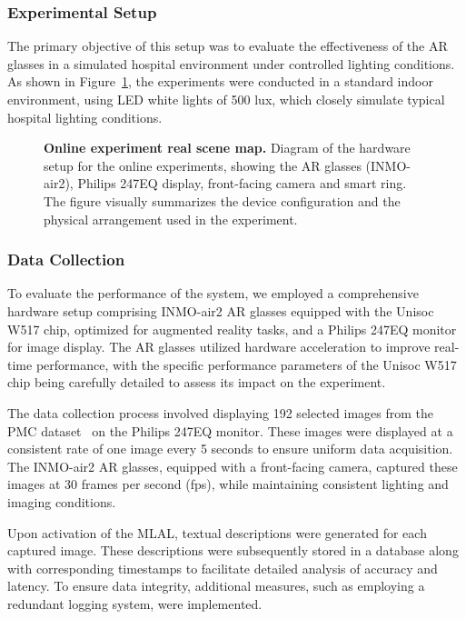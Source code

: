\documentclass[10pt,letterpaper]{article}
\begin{document}
\subsubsection*{Experimental Setup}

The primary objective of this setup was to evaluate the effectiveness of the AR glasses in a simulated hospital environment under controlled lighting conditions. As shown in Figure~\ref{fig:6}, the experiments were conducted in a standard indoor environment, using LED white lights of 500 lux, which closely simulate typical hospital lighting conditions. 

\begin{figure}[!h]
\caption{{\bf Online experiment real scene map.}
Diagram of the hardware setup for the online experiments, showing the AR glasses (INMO-air2), Philips 247EQ display, front-facing camera and smart ring. The figure visually summarizes the device configuration and the physical arrangement used in the experiment.}
\label{fig:6}
\end{figure}

\subsubsection*{Data Collection}

To evaluate the performance of the system, we employed a comprehensive hardware setup comprising INMO-air2 AR glasses equipped with the Unisoc W517 chip, optimized for augmented reality tasks, and a Philips 247EQ monitor for image display. The AR glasses utilized hardware acceleration to improve real-time performance, with the specific performance parameters of the Unisoc W517 chip being carefully detailed to assess its impact on the experiment.

The data collection process involved displaying 192 selected images from the PMC dataset~\cite{lin2023pmc} on the Philips 247EQ monitor. These images were displayed at a consistent rate of one image every 5 seconds to ensure uniform data acquisition. The INMO-air2 AR glasses, equipped with a front-facing camera, captured these images at 30 frames per second (fps), while maintaining consistent lighting and imaging conditions.

Upon activation of the MLAL, textual descriptions were generated for each captured image. These descriptions were subsequently stored in a database along with corresponding timestamps to facilitate detailed analysis of accuracy and latency. To ensure data integrity, additional measures, such as employing a redundant logging system, were implemented.
\end{document}
